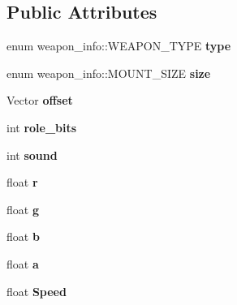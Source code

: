 \subsection*{Public Attributes}
\begin{DoxyCompactItemize}
\item 
enum weapon\+\_\+info\+::\+W\+E\+A\+P\+O\+N\+\_\+\+T\+Y\+PE {\bfseries type}\hypertarget{structweapon__info_a66cc2033110509a7a8f475644f0169f0}{}\label{structweapon__info_a66cc2033110509a7a8f475644f0169f0}

\item 
enum weapon\+\_\+info\+::\+M\+O\+U\+N\+T\+\_\+\+S\+I\+ZE {\bfseries size}\hypertarget{structweapon__info_a658dda2d701accdaacf379c0722e7367}{}\label{structweapon__info_a658dda2d701accdaacf379c0722e7367}

\item 
Vector {\bfseries offset}\hypertarget{structweapon__info_af92d97410ca44e48c43f00c1a74f6abe}{}\label{structweapon__info_af92d97410ca44e48c43f00c1a74f6abe}

\item 
int {\bfseries role\+\_\+bits}\hypertarget{structweapon__info_ac8f0c1a808ada8adf4d94904de2e9053}{}\label{structweapon__info_ac8f0c1a808ada8adf4d94904de2e9053}

\item 
int {\bfseries sound}\hypertarget{structweapon__info_abfe7550fdeff3d21c434fd01b4cde580}{}\label{structweapon__info_abfe7550fdeff3d21c434fd01b4cde580}

\item 
float {\bfseries r}\hypertarget{structweapon__info_af2c053fe290e1f84187b623985e022a6}{}\label{structweapon__info_af2c053fe290e1f84187b623985e022a6}

\item 
float {\bfseries g}\hypertarget{structweapon__info_a1c27664f9d65f2775e3b253e30681701}{}\label{structweapon__info_a1c27664f9d65f2775e3b253e30681701}

\item 
float {\bfseries b}\hypertarget{structweapon__info_a0df3b49e2b8103c88b4e943b7da0f3be}{}\label{structweapon__info_a0df3b49e2b8103c88b4e943b7da0f3be}

\item 
float {\bfseries a}\hypertarget{structweapon__info_ac0b00c8ad07c7317756e71669dbc9468}{}\label{structweapon__info_ac0b00c8ad07c7317756e71669dbc9468}

\item 
float {\bfseries Speed}\hypertarget{structweapon__info_a45063b21e434cc5e8728faaf925dfc6e}{}\label{structweapon__info_a45063b21e434cc5e8728faaf925dfc6e}


\end{DoxyCompactItemize}
